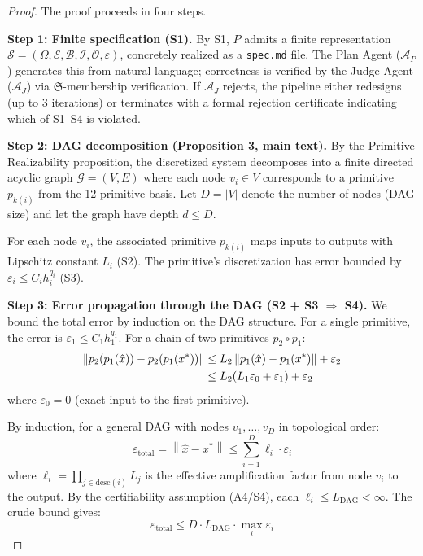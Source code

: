 \documentclass[11pt,a4paper]{article}
\newcommand{\Sclass}{\mathfrak{S}}
\newcommand{\norm}[1]{\left\|#1\right\|}
\newcommand{\Spec}{\mathcal{S}}
\newcommand{\Agent}{\mathcal{A}}
\newcommand{\Domain}{\Omega}
\begin{document}
\begin{proof}
The proof proceeds in four steps.

\textbf{Step 1: Finite specification (S1).}
By S1, $P$ admits a finite representation $\Spec = (\Domain, \mathcal{E}, \mathcal{B}, \mathcal{I}, \mathcal{O}, \varepsilon)$, concretely realized as a \texttt{spec.md} file. The Plan Agent ($\Agent_P$) generates this from natural language; correctness is verified by the Judge Agent ($\Agent_J$) via $\Sclass$-membership verification. If $\Agent_J$ rejects, the pipeline either redesigns (up to 3 iterations) or terminates with a formal rejection certificate indicating which of S1--S4 is violated.

\textbf{Step 2: DAG decomposition (Proposition 3, main text).}
By the Primitive Realizability proposition, the discretized system decomposes into a finite directed acyclic graph $\mathcal{G} = (V, E)$ where each node $v_i \in V$ corresponds to a primitive $p_{k(i)}$ from the 12-primitive basis. Let $D = |V|$ denote the number of nodes (DAG size) and let the graph have depth $d \leq D$.

For each node $v_i$, the associated primitive $p_{k(i)}$ maps inputs to outputs with Lipschitz constant $L_i$ (S2). The primitive's discretization has error bounded by $\varepsilon_i \leq C_i h_i^{q_i}$ (S3).

\textbf{Step 3: Error propagation through the DAG (S2 + S3 $\Rightarrow$ S4).}
We bound the total error by induction on the DAG structure. For a single primitive, the error is $\varepsilon_1 \leq C_1 h_1^{q_1}$. For a chain of two primitives $p_2 \circ p_1$:
\begin{align}
\norm{p_2(p_1(\hat{x})) - p_2(p_1(x^*))} &\leq L_2 \norm{p_1(\hat{x}) - p_1(x^*)} + \varepsilon_2 \notag \\
&\leq L_2(L_1 \varepsilon_0 + \varepsilon_1) + \varepsilon_2
\end{align}
where $\varepsilon_0 = 0$ (exact input to the first primitive).

By induction, for a general DAG with nodes $v_1, \ldots, v_D$ in topological order:
\begin{equation}
\label{eq:total_error}
\varepsilon_{\text{total}} = \norm{\hat{x} - x^*} \leq \sum_{i=1}^{D} \ell_i \cdot \varepsilon_i
\end{equation}
where $\ell_i = \prod_{j \in \text{desc}(i)} L_j$ is the effective amplification factor from node $v_i$ to the output. By the certifiability assumption (A4/S4), each $\ell_i \leq L_{\text{DAG}} < \infty$. The crude bound gives:
\begin{equation}
\varepsilon_{\text{total}} \leq D \cdot L_{\text{DAG}} \cdot \max_i \varepsilon_i
\end{equation}


\end{proof}
\end{document}
